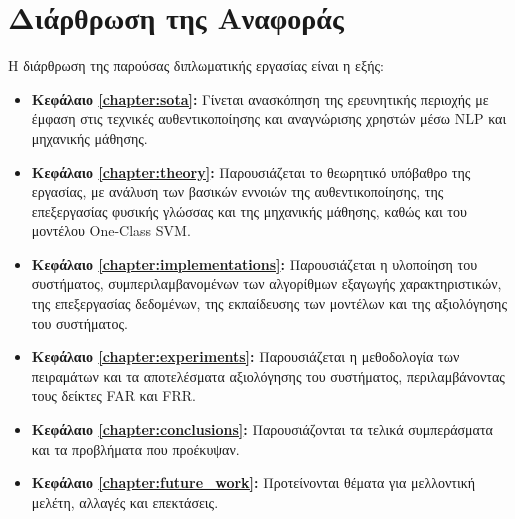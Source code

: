 \newpage
\section{Διάρθρωση της Αναφοράς}
\label{section:layout}

Η διάρθρωση της παρούσας διπλωματικής εργασίας είναι η εξής:

\begin{itemize}
  \item{\textbf{Κεφάλαιο \ref{chapter:sota}:}
    Γίνεται ανασκόπηση της ερευνητικής περιοχής με έμφαση στις τεχνικές αυθεντικοποίησης και αναγνώρισης χρηστών μέσω NLP και μηχανικής μάθησης.
    }
  \item{\textbf{Κεφάλαιο \ref{chapter:theory}:}
    Παρουσιάζεται το θεωρητικό υπόβαθρο της εργασίας, με ανάλυση των βασικών εννοιών της αυθεντικοποίησης, της επεξεργασίας φυσικής γλώσσας και της μηχανικής μάθησης, καθώς και του μοντέλου One-Class SVM.
    }
  \item{\textbf{Κεφάλαιο \ref{chapter:implementations}:}
    Παρουσιάζεται η υλοποίηση του συστήματος, συμπεριλαμβανομένων των αλγορίθμων εξαγωγής χαρακτηριστικών, της επεξεργασίας δεδομένων, της εκπαίδευσης των μοντέλων και της αξιολόγησης του συστήματος.
    }
  \item{\textbf{Κεφάλαιο \ref{chapter:experiments}:}
    Παρουσιάζεται η μεθοδολογία των πειραμάτων και τα αποτελέσματα αξιολόγησης του συστήματος, περιλαμβάνοντας τους δείκτες FAR και FRR.
    }
  \item{\textbf{Κεφάλαιο \ref{chapter:conclusions}:}
    Παρουσιάζονται τα τελικά συμπεράσματα και τα προβλήματα που προέκυψαν.
    }
  \item{\textbf{Κεφάλαιο \ref{chapter:future_work}:}
    Προτείνονται θέματα για μελλοντική
    μελέτη, αλλαγές και επεκτάσεις.
    }
\end{itemize}

